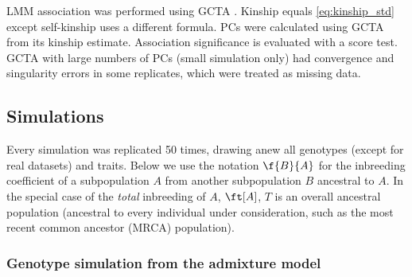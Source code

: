\documentclass[11pt]{article}
\begin{document}
LMM association was performed using GCTA \citep{yang_gcta:_2011,yang_advantages_2014}.
Kinship equals \cref{eq:kinship_std} except self-kinship uses a different formula.
PCs were calculated using GCTA from its kinship estimate.
Association significance is evaluated with a score test.
GCTA with large numbers of PCs (small simulation only) had convergence and singularity errors in some replicates, which were treated as missing data.

\subsection{Simulations}

Every simulation was replicated 50 times, drawing anew all genotypes (except for real datasets) and traits.
Below we use the notation $\f{B}{A}$ for the inbreeding coefficient of a subpopulation $A$ from another subpopulation $B$ ancestral to $A$.
In the special case of the \textit{total} inbreeding of $A$, $\ft[A]$, $T$ is an overall ancestral population (ancestral to every individual under consideration, such as the most recent common ancestor (MRCA) population).

\subsubsection{Genotype simulation from the admixture model}
\end{document}
